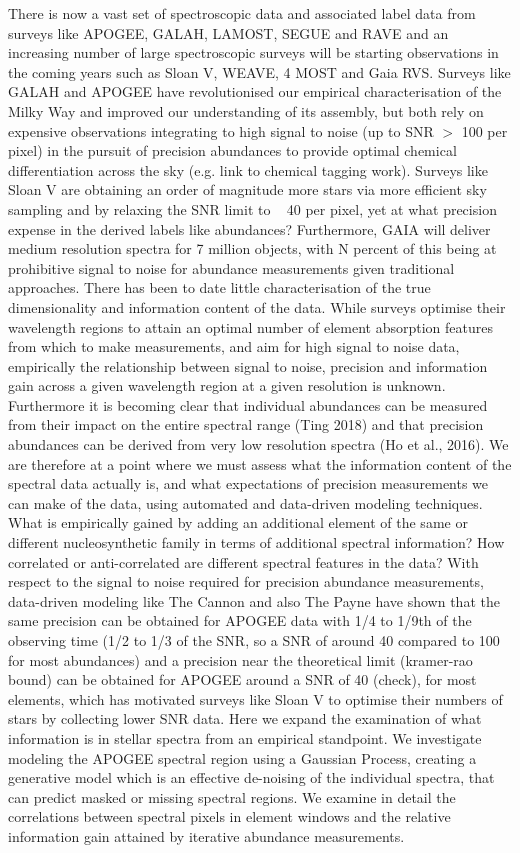 \documentclass[a4paper,fleqn,usenatbib]{mnras}
\begin{document}
There is now a vast set of spectroscopic data and associated label data from surveys like APOGEE, GALAH, LAMOST, SEGUE and RAVE and an increasing number of large spectroscopic surveys will be starting observations in the coming years such as Sloan V, WEAVE, 4 MOST and Gaia RVS. Surveys like GALAH and APOGEE have revolutionised our empirical characterisation of the Milky Way and improved our understanding of its assembly, but both rely on expensive observations integrating to high signal to noise (up to SNR $>$ 100 per pixel) in the pursuit of precision abundances to provide optimal chemical differentiation across the sky (e.g. link to chemical tagging work). Surveys like Sloan V are obtaining an order of magnitude more stars via more efficient sky sampling and by relaxing the SNR limit to ~ 40 per pixel, yet at what precision expense in the derived labels like abundances? Furthermore, GAIA will deliver medium resolution spectra for 7 million objects, with N percent of this being at prohibitive signal to noise for abundance measurements given traditional approaches. There has been to date little characterisation of the true dimensionality and information content of the data. While surveys optimise their wavelength regions to attain an optimal number of element absorption features from which to make measurements, and aim for high signal to noise data, empirically the relationship between signal to noise, precision and information gain across a given wavelength region at a given resolution is unknown. Furthermore it is becoming clear that individual abundances can be measured from their impact on the entire spectral range (Ting 2018) and that precision abundances can be derived from very low resolution spectra (Ho et al., 2016). 
We are therefore at a point where we must assess what the information content of the spectral data actually is, and what expectations of  precision measurements we can make of the data, using automated and data-driven modeling techniques. What is empirically gained by adding an additional element of the same or different nucleosynthetic family in terms of additional spectral information? How correlated or anti-correlated are different spectral features in the data? With respect to the signal to noise required for precision abundance measurements, data-driven modeling like The Cannon and also The Payne have shown that the same precision can be obtained for APOGEE data with 1/4 to 1/9th of the observing time (1/2 to 1/3 of the SNR, so a SNR of around 40 compared to 100 for most abundances) and a precision near the theoretical limit (kramer-rao bound) can be obtained for APOGEE around a SNR of 40 (check), for most elements, which has motivated surveys like Sloan V to optimise their numbers of stars by collecting lower SNR data. Here we expand the 
examination of what information is in stellar spectra from an empirical standpoint. We investigate modeling the APOGEE spectral region using a Gaussian Process, creating a generative model which is an effective de-noising of the individual spectra, that can predict masked or missing spectral regions. We examine in detail the correlations between spectral pixels in element windows and the relative information gain attained by iterative abundance measurements. 
\end{document}
